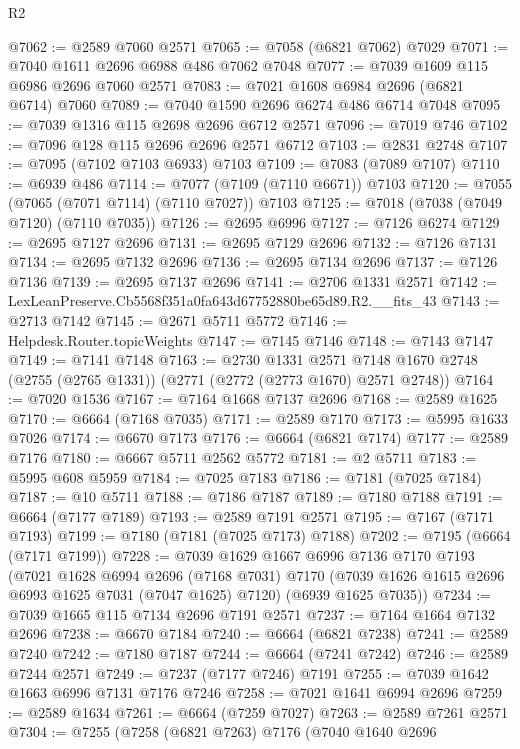 \begin{lexlean}{R2}
\begin{coremodule}
@7062 := @2589 @7060 @2571
@7065 := @7058 (@6821 @7062) @7029
@7071 := @7040 @1611 @2696 @6988 @486 @7062 @7048
@7077 := @7039 @1609 @115 @6986 @2696 @7060 @2571
@7083 := @7021 @1608 @6984 @2696 (@6821 @6714) @7060
@7089 := @7040 @1590 @2696 @6274 @486 @6714 @7048
@7095 := @7039 @1316 @115 @2698 @2696 @6712 @2571
@7096 := @7019 @746
@7102 := @7096 @128 @115 @2696 @2696 @2571 @6712
@7103 := @2831 @2748
@7107 := @7095 (@7102 @7103 @6933) @7103
@7109 := @7083 (@7089 @7107)
@7110 := @6939 @486
@7114 := @7077 (@7109 (@7110 @6671)) @7103
@7120 := @7055 (@7065 (@7071 @7114) (@7110 @7027)) @7103
@7125 := @7018 (@7038 (@7049 @7120) (@7110 @7035))
@7126 := @2695 @6996
@7127 := @7126 @6274
@7129 := @2695 @7127 @2696
@7131 := @2695 @7129 @2696
@7132 := @7126 @7131
@7134 := @2695 @7132 @2696
@7136 := @2695 @7134 @2696
@7137 := @7126 @7136
@7139 := @2695 @7137 @2696
@7141 := @2706 @1331 @2571
@7142 := LexLeanPreserve.Cb5568f351a0fa643d67752880be65d89.R2.__fits_43
@7143 := @2713 @7142
@7145 := @2671 @5711 @5772
@7146 := Helpdesk.Router.topicWeights
@7147 := @7145 @7146
@7148 := @7143 @7147
@7149 := @7141 @7148
@7163 := @2730
    @1331
    @2571
    @7148
    @1670
    @2748
    (@2755 (@2765 @1331))
    (@2771 (@2772 (@2773 @1670) @2571 @2748))
@7164 := @7020 @1536
@7167 := @7164 @1668 @7137 @2696
@7168 := @2589 @1625
@7170 := @6664 (@7168 @7035)
@7171 := @2589 @7170
@7173 := @5995 @1633 @7026
@7174 := @6670 @7173
@7176 := @6664 (@6821 @7174)
@7177 := @2589 @7176
@7180 := @6667 @5711 @2562 @5772
@7181 := @2 @5711
@7183 := @5995 @608 @5959
@7184 := @7025 @7183
@7186 := @7181 (@7025 @7184)
@7187 := @10 @5711
@7188 := @7186 @7187
@7189 := @7180 @7188
@7191 := @6664 (@7177 @7189)
@7193 := @2589 @7191 @2571
@7195 := @7167 (@7171 @7193)
@7199 := @7180 (@7181 (@7025 @7173) @7188)
@7202 := @7195 (@6664 (@7171 @7199))
@7228 := @7039
    @1629
    @1667
    @6996
    @7136
    @7170
    @7193
    (@7021
      @1628
      @6994
      @2696
      (@7168 @7031)
      @7170
      (@7039 @1626 @1615 @2696 @6993 @1625 @7031 (@7047 @1625) @7120)
      (@6939 @1625 @7035))
@7234 := @7039 @1665 @115 @7134 @2696 @7191 @2571
@7237 := @7164 @1664 @7132 @2696
@7238 := @6670 @7184
@7240 := @6664 (@6821 @7238)
@7241 := @2589 @7240
@7242 := @7180 @7187
@7244 := @6664 (@7241 @7242)
@7246 := @2589 @7244 @2571
@7249 := @7237 (@7177 @7246) @7191
@7255 := @7039 @1642 @1663 @6996 @7131 @7176 @7246
@7258 := @7021 @1641 @6994 @2696
@7259 := @2589 @1634
@7261 := @6664 (@7259 @7027)
@7263 := @2589 @7261 @2571
@7304 := @7255
    (@7258
      (@6821 @7263)
      @7176
      (@7040
        @1640
        @2696

\end{coremodule}
\end{lexlean}

